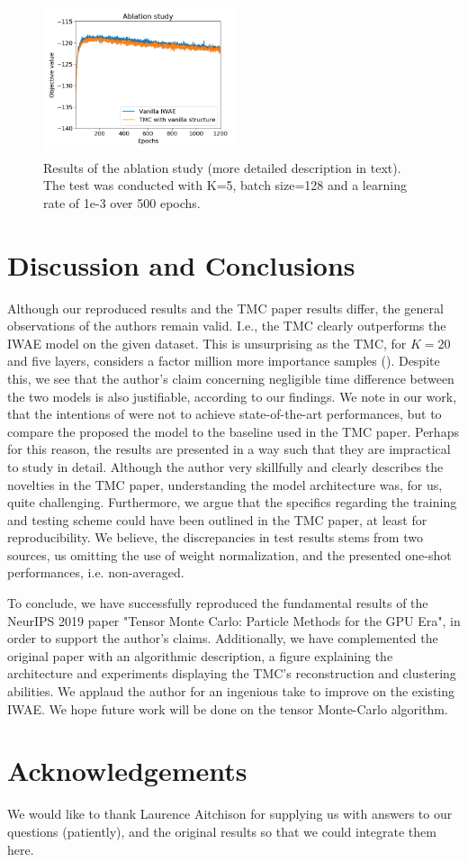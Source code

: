 \begin{figure}[th!]
    \centering
    \includegraphics[width=0.5\textwidth, height=4.5cm]{Figures/ablation_study_tmc.png}
    \caption{Results of the ablation study (more detailed description in text). The test was conducted with K=5, batch size=128 and a learning rate of 1e-3 over 500 epochs.}
    \label{fig:ablation_study}
\end{figure}
\section{Discussion and Conclusions}
Although our reproduced results and the TMC paper results differ,
the general observations of the authors remain valid. I.e., the TMC clearly outperforms the IWAE model on the given dataset. This is unsurprising as the TMC, for $K=20$ and five layers, considers a factor million more importance samples (\cite{tmc}). Despite this, we see that the author's claim concerning negligible time difference between the two models is also justifiable, according to our findings. We note in our work, that the intentions of \cite{tmc} were not to achieve state-of-the-art performances, but to compare the proposed the model to the baseline used in the TMC paper. Perhaps for this reason, the results are presented in a way such that they are impractical to study in detail. Although the author very skillfully and clearly describes the novelties in the TMC paper, understanding the model architecture was, for us, quite challenging. Furthermore, we argue that the specifics regarding the training and testing scheme could have been outlined in the TMC paper, at least for reproducibility.
We believe, the discrepancies in test results stems from two sources, us omitting the use of weight normalization, and the presented one-shot performances, i.e. non-averaged. 

To conclude, we have successfully reproduced the fundamental results of the NeurIPS 2019 paper "Tensor Monte Carlo: Particle Methods for the GPU Era", in order to support the author's claims. Additionally, we have complemented the original paper with an algorithmic description, a figure explaining the architecture and experiments displaying the TMC's reconstruction and clustering abilities. We applaud the author for an ingenious take to improve on the existing IWAE. We hope future work will be done on the tensor Monte-Carlo algorithm. 

\section{Acknowledgements}
We would like to thank Laurence Aitchison for supplying us with answers to our questions (patiently), and the original results so that we could integrate them here. 
% 
%



